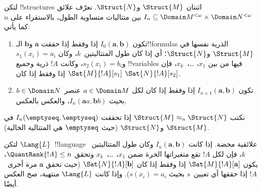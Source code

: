 \documentclass[../../../include/open-logic-section]{subfiles}
\begin{document}
\begin{defn}
  لتكن !!{structure}s اثنتان $\Struct{M}$ و$\Struct{N}$. نعرّف علائق
  $I_n \subseteq \Domain M^{<\omega} \times \Domain N^{<\omega}$ بين
  متتاليات متساوية الطول، بالاستقراء على $n$ كما يأتي:
   \begin{enumerate}
   \item تكون $I_0(\mathbf{a},\mathbf{b})$ إذا وفقط إذا حققت
     $\mathbf{a}$ و$\mathbf{b}$ الـ!!{formula}s الذرية نفسها في
     $\Struct{M}$ و$\Struct{N}$؛ أي إذا كان طول المتتاليتين~$k$، وكان
     $s_1(x_i)=a_i$ و$s_2(x_i)=b_i$، وكانت $!A$ ذرية وجميع
     !!{variable}s فيها من بين $x_1$، \dots،~$x_k$، فإن
     $\Sat{M}{!A}[s_1]$ إذا وفقط إذا كان $\Sat{N}{!A}[s_2]$.
   \item تكون $I_{n+1}(\mathbf{a},\mathbf{b})$ إذا وفقط إذا كان لكل
     $a\in \Domain M$ عنصر~$b\in \Domain N$ بحيث
     $I_n(\mathbf{a}a,\mathbf{b}b)$، والعكس بالعكس.
   \end{enumerate}
\end{defn}


\begin{defn}
  نكتب $\Struct{M} \approx_n \Struct{N}$ إذا تحققت
  $I_n(\emptyseq,\emptyseq)$ في $\Struct{M}$ و$\Struct{N}$ (حيث
  $\emptyseq$ هي المتتالية الخالية).
\end{defn}

\begin{thm}
  لتكن $\Lang{L}$~!!{language} علائقية محضة. إذا كانت
  $I_n(\mathbf{a},\mathbf{b})$ وكان طول المتتاليتين~$k$، فإن لكل $!A$
  تقع متغيراتها الحرة ضمن $x_1$، \dots،~$x_k$ وتحقق
  $\QuantRank{!A} \le n$، يكون $\Sat{M}{!A}[\mathbf{a}]$ إذا وفقط إذا
  كان $\Sat{N}{!A}[\mathbf{b}]$ (حيث تحقق $\mathbf{a}$ مرة أخرى~$!A$
  إذا حققها أي تعيين~$s$ بحيث $s(x_i)=a_i$). وإذا كانت $\Lang{L}$
  منتهية، صح العكس أيضًا.
\end{thm}
\end{document}
